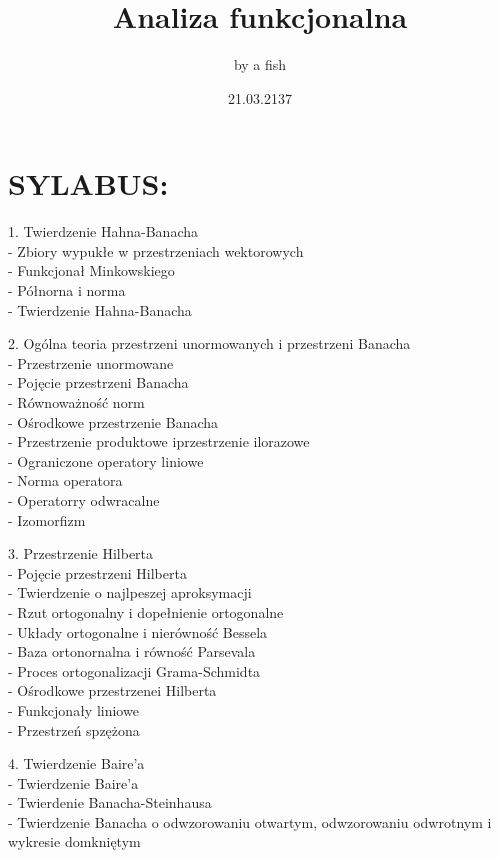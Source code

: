 \documentclass{article}
\title {Analiza funkcjonalna}
\author{by a fish}
\date {21.03.2137}
\begin{document}
\maketitle

\newpage

\section*{SYLABUS:}
1. Twierdzenie Hahna-Banacha\\
\indent - Zbiory wypukłe w przestrzeniach wektorowych\\
\indent - Funkcjonał Minkowskiego\\
\indent - Półnorna i norma\\
\indent - Twierdzenie Hahna-Banacha\smallskip

2. Ogólna teoria przestrzeni unormowanych i przestrzeni Banacha\\
\indent - Przestrzenie unormowane\\
\indent - Pojęcie przestrzeni Banacha\\
\indent - Równoważność norm\\
\indent - Ośrodkowe przestrzenie Banacha\\
\indent - Przestrzenie produktowe iprzestrzenie ilorazowe\\
\indent - Ograniczone operatory liniowe\\
\indent - Norma operatora\\
\indent - Operatorry odwracalne\\
\indent - Izomorfizm\smallskip

3. Przestrzenie Hilberta\\
\indent - Pojęcie przestrzeni Hilberta\\
\indent - Twierdzenie o najlpeszej aproksymacji\\
\indent - Rzut ortogonalny i dopełnienie ortogonalne\\
\indent - Układy ortogonalne i nierówność Bessela\\
\indent - Baza ortonornalna i równość Parsevala\\
\indent - Proces ortogonalizacji Grama-Schmidta\\
\indent - Ośrodkowe przestrzenei Hilberta\\
\indent - Funkcjonały liniowe\\
\indent - Przestrzeń spzężona\smallskip

4. Twierdzenie Baire'a\\
\indent - Twierdzenie Baire'a\\
\indent - Twierdenie Banacha-Steinhausa\\
\indent - Twierdzenie Banacha o odwzorowaniu otwartym, odwzorowaniu odwrotnym i wykresie domkniętym\smallskip
\end{document}

